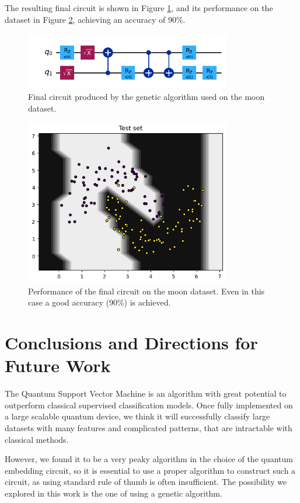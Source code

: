\documentclass[12pt]{article}
\begin{document}
The resulting final circuit is shown in Figure \ref{fig:mooncircuit}, and its performance on the dataset in Figure \ref{fig:moonboh}, achieving an accuracy of 90\%. 
\begin{figure}[h!]
    \centering
    \includegraphics[width=0.8\textwidth]{images/mooncircuit.png}
    \caption{Final circuit produced by the genetic algorithm used on the moon dataset.}
    \label{fig:mooncircuit}
\end{figure}\begin{figure}[h!]
    \centering
    \includegraphics[width=0.8\textwidth]{images/moonboh.png}
    \caption{Performance of the final circuit on the moon dataset. Even in this case a good accuracy (90\%) is achieved.}
    \label{fig:moonboh}
\end{figure}


\newpage 
\section{Conclusions and Directions for Future Work}
The Quantum Support Vector Machine is an algorithm with great potential to outperform classical supervised classification models. Once fully implemented on a large scalable quantum device, we think it will successfully classify large datasets with many features and complicated patterns, that are intractable with classical methods. 

However, we found it to be a very peaky algorithm in the choice of the quantum embedding circuit, so it is essential to use a proper algorithm to construct such a circuit, as using standard rule of thumb is often insufficient. The possibility we explored in this work is the one of using a genetic algorithm. 
\end{document}
